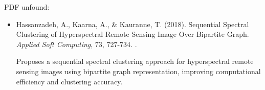 \documentclass[10pt,svgnames,fragile]{beamer}
\begin{document}
\begin{frame}{PDF unfound:}
\tiny
\begin{itemize}

\item Hassanzadeh, A., Kaarna, A., \& Kauranne, T. (2018). Sequential Spectral Clustering of Hyperspectral Remote Sensing Image Over Bipartite Graph. \textit{Applied Soft Computing}, 73, 727-734. \href{https://doi.org/10.1016/j.asoc.2018.09.015}{\color{blue}{DOI: 10.1016/j.asoc.2018.09.015}}.

{\color{gray}Proposes a sequential spectral clustering approach for hyperspectral remote sensing images using bipartite graph representation, improving computational efficiency and clustering accuracy.}
\end{itemize}

\end{frame}
\end{document}
